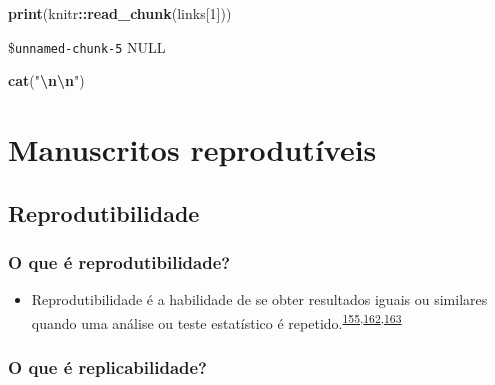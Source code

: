\documentclass[
]{book}
\newenvironment{Shaded}{\begin{snugshade}}{\end{snugshade}}
\newcommand{\DecValTok}[1]{\textcolor[rgb]{0.00,0.00,0.81}{#1}}
\newcommand{\FunctionTok}[1]{\textcolor[rgb]{0.13,0.29,0.53}{\textbf{#1}}}
\newcommand{\NormalTok}[1]{#1}
\newcommand{\SpecialCharTok}[1]{\textcolor[rgb]{0.81,0.36,0.00}{\textbf{#1}}}
\newcommand{\StringTok}[1]{\textcolor[rgb]{0.31,0.60,0.02}{#1}}
\providecommand{\tightlist}{%
  \setlength{\itemsep}{0pt}\setlength{\parskip}{0pt}}
\begin{document}
\begin{Shaded}
\begin{Highlighting}[]
\FunctionTok{print}\NormalTok{(knitr}\SpecialCharTok{::}\FunctionTok{read\_chunk}\NormalTok{(links[}\DecValTok{1}\NormalTok{]))}
\end{Highlighting}
\end{Shaded}

\$\texttt{unnamed-chunk-5}
NULL

\begin{Shaded}
\begin{Highlighting}[]
\FunctionTok{cat}\NormalTok{(}\StringTok{"}\SpecialCharTok{\textbackslash{}n\textbackslash{}n}\StringTok{"}\NormalTok{)}
\end{Highlighting}
\end{Shaded}

\hypertarget{manuscritos-reprodutiveis}{%
\chapter{\texorpdfstring{\textbf{Manuscritos reprodutíveis}}{Manuscritos reprodutíveis}}\label{manuscritos-reprodutiveis}}

\hypertarget{reprodutibilidade}{%
\section{Reprodutibilidade}\label{reprodutibilidade}}

\hypertarget{o-que-uxe9-reprodutibilidade}{%
\subsection{O que é reprodutibilidade?}\label{o-que-uxe9-reprodutibilidade}}

\begin{itemize}
\tightlist
\item
  Reprodutibilidade é a habilidade de se obter resultados iguais ou similares quando uma análise ou teste estatístico é repetido.\textsuperscript{\protect\hyperlink{ref-mair2016}{155},\protect\hyperlink{ref-resnik2016}{162},\protect\hyperlink{ref-hofner2015}{163}}
\end{itemize}

\hypertarget{o-que-uxe9-replicabilidade}{%
\subsection{O que é replicabilidade?}\label{o-que-uxe9-replicabilidade}}
\end{document}
